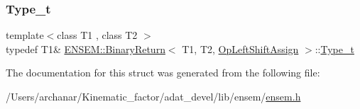 \mbox{\label{structENSEM_1_1BinaryReturn_3_01T1_00_01T2_00_01OpLeftShiftAssign_01_4_a86e3783b9979825629679e9fc7023298}} 
\subsubsection{\texorpdfstring{Type\_t}{Type\_t}\hspace{0.1cm}{\footnotesize\ttfamily [2/2]}}
{\footnotesize\ttfamily template$<$class T1 , class T2 $>$ \\
typedef T1\& \mbox{\hyperlink{structENSEM_1_1BinaryReturn}{E\+N\+S\+E\+M\+::\+Binary\+Return}}$<$ T1, T2, \mbox{\hyperlink{structENSEM_1_1OpLeftShiftAssign}{Op\+Left\+Shift\+Assign}} $>$\+::\mbox{\hyperlink{structENSEM_1_1BinaryReturn_3_01T1_00_01T2_00_01OpLeftShiftAssign_01_4_a86e3783b9979825629679e9fc7023298}{Type\+\_\+t}}}



The documentation for this struct was generated from the following file\+:\begin{DoxyCompactItemize}
\item 
/\+Users/archanar/\+Kinematic\+\_\+factor/adat\+\_\+devel/lib/ensem/\mbox{\hyperlink{lib_2ensem_2ensem_8h}{ensem.\+h}}\end{DoxyCompactItemize}
